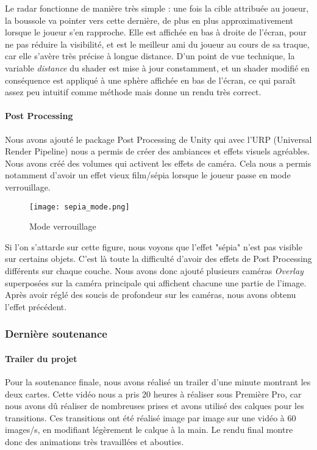         Le radar fonctionne de manière très simple : une fois la cible attribuée au joueur, la boussole va pointer vers cette dernière, de plus 
        en plus approximativement lorsque le joueur s'en rapproche. Elle est affichée en bas à droite de l'écran, pour ne pas réduire la 
        visibilité, et est le meilleur ami du joueur au cours de sa traque, car elle s'avère très précise à longue distance.
        D'un point de vue technique, la variable \textit{distance} du shader est mise à jour constamment, et un shader modifié en conséquence 
        est appliqué à une sphère affichée en bas de l'écran, ce qui paraît assez peu intuitif comme méthode mais donne un rendu très correct. 
        

        \paragraph{Post Processing}

        Nous avons ajouté le package Post Processing de Unity qui avec l'URP (Universal Render Pipeline)
        nous a permis de créer des ambiances et effets visuels agréables.
        Nous avons créé des volumes qui activent les effets de caméra.
        Cela nous a permis notamment d'avoir un effet vieux film/sépia lorsque le joueur passe en mode verrouillage.

        \begin{figure}[hbt!]
            \centering
            \texttt{[image: sepia\_mode.png]}
            \caption{Mode verrouillage}
        \end{figure}
        \FloatBarrier


        Si l'on s'attarde sur cette figure, nous voyons que l'effet "sépia" n'est pas visible sur certains objets.
        C'est là toute la difficulté d'avoir des effets de Post Processing différents sur chaque couche.
        Nous avons donc ajouté plusieurs caméras \textit{Overlay} superposées sur la caméra principale qui affichent chacune une partie de l'image.
        Après avoir réglé des soucis de profondeur sur les caméras, nous avons obtenu l'effet précédent.

    \subsubsection{Dernière soutenance}

        \paragraph{Trailer du projet}

        Pour la soutenance finale, nous avons réalisé un trailer d'une minute montrant les deux cartes. Cette vidéo nous a pris 
        20 heures à réaliser sous Première Pro, car nous avons dû réaliser de nombreuses prises et avons utilisé des calques 
        pour les transitions. Ces transitions ont été réalisé image par image sur une vidéo à 60 images/s, en modifiant légèrement 
        le calque à la main. Le rendu final montre donc des animations très travaillées et abouties.